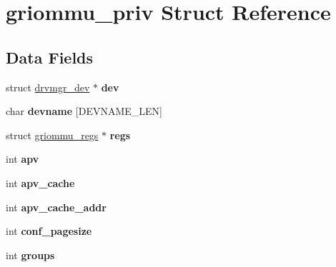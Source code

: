 \hypertarget{structgriommu__priv}{}\section{griommu\+\_\+priv Struct Reference}
\label{structgriommu__priv}
\subsection*{Data Fields}
\begin{DoxyCompactItemize}
\item 
\mbox{\label{structgriommu__priv_a8647821f8b0ec1235ed992d1df00995b}} 
struct \mbox{\hyperlink{structdrvmgr__dev}{drvmgr\+\_\+dev}} $\ast$ {\bfseries dev}
\item 
\mbox{\label{structgriommu__priv_ab06c029da36ecb37cf796dc4a4343ef9}} 
char {\bfseries devname} \mbox{[}D\+E\+V\+N\+A\+M\+E\+\_\+\+L\+EN\mbox{]}
\item 
\mbox{\label{structgriommu__priv_a96b2ff4b1a36af56e10cdd351de240c8}} 
struct \mbox{\hyperlink{structgriommu__regs}{griommu\+\_\+regs}} $\ast$ {\bfseries regs}
\item 
\mbox{\label{structgriommu__priv_a966b90084fb57ae07e2489cbfd40ecad}} 
int {\bfseries apv}
\item 
\mbox{\label{structgriommu__priv_a0aa94fee9b6489a4d763e2ad390677f4}} 
int {\bfseries apv\+\_\+cache}
\item 
\mbox{\label{structgriommu__priv_a9cb6134b965af71b61ab5ee6d4b86f7c}} 
int {\bfseries apv\+\_\+cache\+\_\+addr}
\item 
\mbox{\label{structgriommu__priv_a05c498aa6d06a597536b2ecbf150941e}} 
int {\bfseries conf\+\_\+pagesize}
\item 
\mbox{\label{structgriommu__priv_aead3e923ed16082d8068e3042e050a6c}} 
int {\bfseries groups}
\item 
\mbox{\label{structgriommu__priv_ada6972bc825364277a8ee2097ee6ea38}} 

\end{DoxyCompactItemize}
